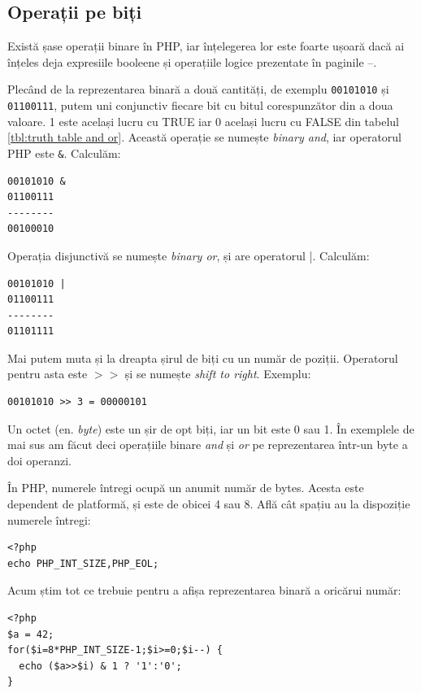 \subsection{Operații pe biți}
Există șase operații binare în PHP, iar înțelegerea lor este
foarte ușoară dacă ai înțeles deja expresiile booleene și
operațiile logice prezentate în paginile
\pageref{sec:tipul de date boolean. Expresii logice}--\pageref{endsec:tipul de date boolean. Expresii logice}.

Plecând de la reprezentarea binară a două cantități, de exemplu \texttt{00101010} și
\texttt{01100111}, putem uni conjunctiv fiecare bit cu bitul corespunzător din a doua valoare.
1 este același lucru cu TRUE iar 0 același lucru cu FALSE din tabelul \ref{tbl:truth table and or}.
Această operație se numește \textsl{binary and}, iar operatorul PHP este \texttt{\&}.
Calculăm:
\begin{verbatim}
00101010 &
01100111
--------
00100010
\end{verbatim}

Operația disjunctivă se numește \textsl{binary or}, și are operatorul |. Calculăm:
\begin{verbatim}
00101010 |
01100111
--------
01101111
\end{verbatim}

Mai putem muta și la dreapta șirul de biți cu un număr de poziții. Operatorul
pentru asta este \texttt{$>>$} și se numește \textsl{shift to right}. Exemplu:
\begin{verbatim}
00101010 >> 3 = 00000101
\end{verbatim}

Un octet (en. \textsl{byte}) este un șir de opt biți,
iar un bit este 0 sau 1. În exemplele de mai sus am făcut deci operațiile binare
\textit{and} și \textit{or} pe reprezentarea într-un byte a doi operanzi.

În PHP, numerele întregi ocupă un anumit număr de bytes. Acesta este dependent de
platformă, și este de obicei 4 sau 8. Află cât spațiu au la dispoziție numerele
întregi:
\begin{lstlisting}
<?php
echo PHP_INT_SIZE,PHP_EOL;
\end{lstlisting}

Acum știm tot ce trebuie pentru a afișa reprezentarea binară a oricărui număr:
\begin{lstlisting}[label=lst:bitbybit,caption={Afișarea bit cu bit a unui int}]
<?php
$a = 42;
for($i=8*PHP_INT_SIZE-1;$i>=0;$i--) {
  echo ($a>>$i) & 1 ? '1':'0';
}
\end{lstlisting}

